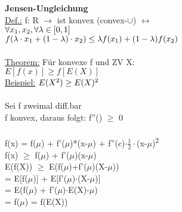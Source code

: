 \documentclass{article}
\begin{document}
 	\textbf{Jensen-Ungleichung} \\
 	\underline{Def.:}	f: R $\rightarrow$ ist konvex (convex-$\cup$) $\leftrightarrow$ \\
 	$\forall x\textsubscript{1}, x\textsubscript{2} , \forall \lambda \in [0,1]$ \\
 	$f(\lambda \cdot x\textsubscript{1} + (1-\lambda) \cdot x\textsubscript{2}) \leq \lambda f(x\textsubscript{1}) + (1-\lambda)f(x\textsubscript{2})$ \\
 	\\
 	\underline{Theorem:} Für konvexe f und ZV X: \\
 	$E[f(x)] \geq f[E(X)]$ \\
 	\underline{Beispiel:} $E(X\textsuperscript{2}) \geq E(X)\textsuperscript{2}$ \\
 	\\
 	Sei f zweimal diff.bar \\
 	f konvex, daraus folgt: f''() $\geq$ 0 \\
 	\\
 	f(x) = f($\mu$) + f'($\mu$)*(x-$\mu$) + f''(c)$\cdot \frac{1}{2} \cdot$(x-$\mu$)\textsuperscript{2} \\
 	f(x) $\geq$ f($\mu$) + f'($\mu$)(x-$\mu$) \\
 	E(f(X)) $\geq$ E(f($\mu$)+f'($\mu$)(X-$\mu$)) \\
 	= E[f($\mu$)] + E[f'($\mu$)$\cdot$(X-$\mu$)] \\
 	= E(f($\mu$) + f'($\mu$)$\cdot$E(X)-$\mu$) \\
 	= f($\mu$) = f(E(X)) \\
 	
 
\end{document}

